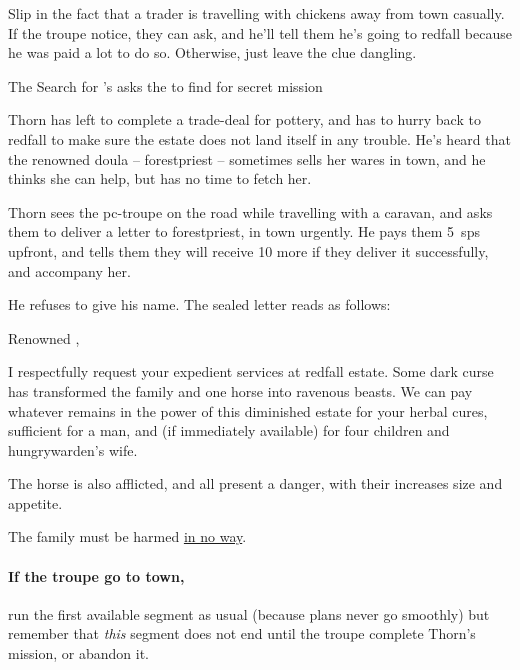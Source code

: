 Slip in the fact that a trader is travelling with chickens away from \gls{town} casually.
If the troupe notice, they can ask, and he'll tell them he's going to \gls{redfall} because he was paid a lot to do so.
Otherwise, just leave the clue dangling.

{The Search for }%
{'s  asks the  to find  for secret mission}%
\label{nonstarter}

\begin{exampletext}
  Thorn has left to complete a trade-deal for pottery, and has to hurry back to \gls{redfall} to make sure the estate does not land itself in any trouble.
  He's heard that the renowned \gls{doula} -- \gls{forestpriest} -- sometimes sells her wares in \gls{town}, and he thinks she can help, but has no time to fetch her.
\end{exampletext}

Thorn sees the \gls{pc}-troupe on the road while travelling with a caravan, and asks them to deliver a letter to \gls{forestpriest}, in \gls{town} urgently.
He pays them 5~\glspl{sp} upfront, and tells them they will receive 10 more if they deliver it successfully, and accompany her.

He refuses to give his name.
The sealed letter reads as follows:

\null
\begin{speechtext}
  Renowned ,

  I respectfully request your expedient services at \gls{redfall} estate.
  Some dark curse has transformed the family and one horse into ravenous beasts.
  We can pay whatever remains in the power of this diminished estate for your herbal cures, sufficient for a man, and (if immediately available) for four children and \gls{hungrywarden}'s wife.

  The horse is also afflicted, and all present a danger, with their increases size and appetite.

  The family must be harmed \underline{in no way}.
\end{speechtext}

\thornSeneschal

\label{thorn}

\paragraph{If the troupe go to \gls{town},}
run the first available \gls{segment} as usual (because plans never go smoothly) but remember that \emph{this} \gls{segment} does not end until the troupe complete Thorn's mission, or abandon it.

